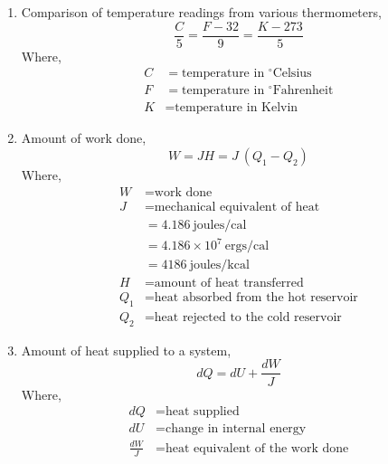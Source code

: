 \documentclass[12pt]{article}
\begin{document}
\begin{enumerate}[label=\roman*.]
    \item Comparison of temperature readings from various thermometers,
    \[
    \frac{C}{5} = \frac{F - 32}{9} = \frac{K - 273}{5}
    \]
    Where,
    \begin{align*}
        C &= \text{temperature in } ^{\circ} \text{Celsius} \\
        F &= \text{temperature in } ^{\circ} \text{Fahrenheit} \\
        K &= \text{temperature in Kelvin}
    \end{align*}

	\item Amount of work done,
		$$ W = JH = J \ (Q_{1} - Q_{2})$$
		Where,
		\begin{align*}
			W  &= \text{work done} \\[10pt]
			J  &= \text{mechanical equivalent of heat} \\
			   &= 4.186 \ \text{joules/cal} \\
			   &= 4.186 \times 10^7 \ \text{ergs/cal} \\
			   &= 4186 \ \text{joules/kcal} \\[10pt]
			H  &= \text{amount of heat transferred} \\[10pt]
			Q_{1} &= \text{heat absorbed from the hot reservoir} \\
			Q_{2} &= \text{heat rejected to the cold reservoir}
		\end{align*}

	\item Amount of heat supplied to a system,
		$$ dQ = dU + \frac{dW}{J} $$
		Where,
		\begin{align*}
			dQ &= \text{heat supplied} \\
			dU &= \text{change in internal energy} \\
			\frac{dW}{J} &= \text{heat equivalent of the work done}
		\end{align*}



\end{enumerate}
\end{document}
